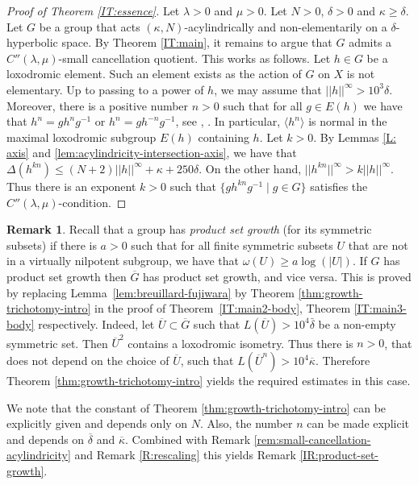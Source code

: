 \documentclass[leqno,a4paper,10pt]{amsart}
\theoremstyle{plain}
\theoremstyle{definition}
\newtheorem{rem}[thm]{Remark}
\theoremstyle{remark}
\let\ge\geqslant
\begin{document}
\begin{proof}[Proof of Theorem \ref{IT:essence}] Let $\lambda >0$ and $\mu >0$. Let $N>0$, $\delta>0$ and $\kappa\geqslant \delta$. Let $G$ be a group that acts $(\kappa,N)$-acylindrically and non-elementarily on a $\delta$-hyperbolic space. By Theorem \ref{IT:main}, it remains to argue that $G$ admits a $C''(\lambda,\mu)$-small cancellation quotient. This works as follows. Let $h\in G$ be a loxodromic element. Such an element exists as the action of $G$ on $X$ is not elementary. Up to passing to a power of $h$, we may assume that  $||h||^{\infty}>10^3\delta$.  Moreover, there is a positive number $n>0$ such that for all $g\in E(h)$ we have that $h^{n}=gh^{n}g^{-1}$ or $h^{n}=gh^{- n}g^{-1}$, see \cite[Lemma 19]{ivanov_hyperbolic_1996}, \cite[Lemma 3.38]{coulon_partial_2016}. In particular, $\langle
h^n\rangle$  is normal in the maximal loxodromic subgroup $E(h)$ containing $h$. Let $k>0$. By Lemmas \ref{L: axis} and \ref{lem:acylindricity-intersection-axis}, we have that $\Delta (h^{kn})\leqslant (N+2)||h||^{\infty} +\kappa +250\delta$. On the other hand, $||h^{kn}||^{\infty}>k||h||^{\infty}$. Thus there is an exponent $k>0$ such that $\{g h^{kn} g^{-1}\mid g\in G\}$ satisfies the $C''(\lambda,\mu)$-condition. 
\end{proof}

\begin{rem}\label{R:product-set-growth} Recall that a group has \emph{product set growth} (for its symmetric subsets) if there is $a>0$ such that for all finite symmetric subsets $U$ that are not in a virtually nilpotent subgroup, we have that $\omega(U)\ge a \log(|U|)$. If $G$ has product set growth then $\overline{G}$ has product set growth, and vice versa. This is proved by replacing Lemma~\ref{lem:breuillard-fujiwara} by Theorem \ref{thm:growth-trichotomy-intro} in the proof of Theorem~\ref{IT:main2-body}, Theorem \ref{IT:main3-body} respectively. Indeed, let $\overline U\subset \overline{G}$ such that  $L(\overline{U})>10^4 \bar{\delta}$ be a non-empty symmetric set. Then $\overline{U}^2$ contains a loxodromic isometry. Thus there is $n>0$, that does not depend on the choice of $\overline{U}$, such that $L(\overline U^n)>10^4\overline{\kappa}$. Therefore Theorem \ref{thm:growth-trichotomy-intro} yields the required estimates in this case.

  We note that the constant of Theorem \ref{thm:growth-trichotomy-intro} can be explicitly given and depends only on $N$. Also, the number $n$ can be made explicit and depends on $\overline \delta$ and $\overline{\kappa}$. Combined with Remark \ref{rem:small-cancellation-acylindricity}  and Remark \ref{R:rescaling} this yields Remark \ref{IR:product-set-growth}. 
\end{rem}
\end{document}
